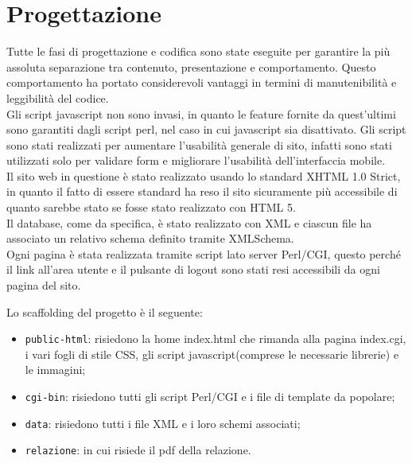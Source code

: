 \section{Progettazione}
Tutte le fasi di progettazione e codifica sono state eseguite per garantire la più assoluta separazione tra contenuto, presentazione e comportamento. Questo comportamento ha portato considerevoli vantaggi in termini di manutenibilità e leggibilità del codice.\\
Gli script javascript non sono invasi, in quanto le feature fornite da quest'ultimi sono garantiti dagli script perl, nel caso in cui javascript sia disattivato. Gli script sono stati realizzati per aumentare l'usabilità generale di sito, infatti sono stati utilizzati solo per validare form e migliorare l'usabilità dell'interfaccia mobile.\\
Il sito web in questione è stato realizzato usando lo standard XHTML 1.0 Strict, in quanto il fatto di essere standard ha reso il sito sicuramente più accessibile di quanto sarebbe stato se fosse stato realizzato con HTML 5.\\
Il database, come da specifica, è stato realizzato con XML e ciascun file ha associato un relativo schema definito tramite XMLSchema.\\
Ogni pagina è stata realizzata tramite script lato server Perl/CGI, questo perché il link all'area utente e il pulsante di logout sono stati resi accessibili da ogni pagina del sito.

Lo scaffolding del progetto è il seguente:

\begin{itemize}

	\item \texttt{public-html}: risiedono la home index.html che rimanda alla pagina index.cgi, i vari fogli di stile CSS, gli script javascript(comprese le necessarie librerie) e le immagini;
	\item \texttt{cgi-bin}: risiedono tutti gli script Perl/CGI e i file di template da popolare;
	\item \texttt{data}: risiedono tutti i file XML e i loro schemi associati;
	\item \texttt{relazione}: in cui risiede il pdf della relazione.

\end{itemize}